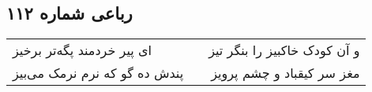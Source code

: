 \begin{center}
\section*{رباعی شماره ۱۱۲}
\label{sec:sh112}
\begin{longtable}{l p{0.5cm} r}
ای پیر خردمند پگه‌تر برخیز
&&
و آن کودک خاکبیز را بنگر تیز
\\
پندش ده گو که نرم نرمک می‌بیز
&&
مغز سر کیقباد و چشم پرویز
\\
\end{longtable}
\end{center}
